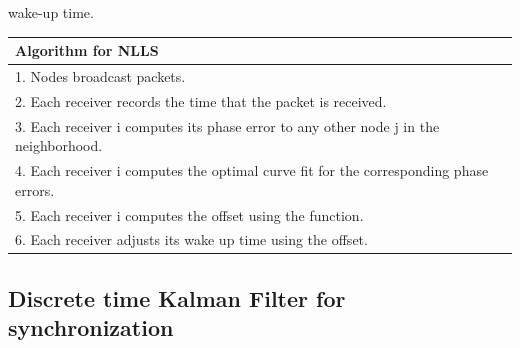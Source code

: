 \documentclass[a4paper,10pt]{report}
\begin{document}
wake-up time. \newline
\newline
\begin{tabular}{  l }Algorithm for NLLS \\\hline
1. Nodes broadcast packets. \\  2. Each receiver records the time that the packet is received. \\
3. Each receiver i computes its phase error to any other node j in the neighborhood. \\
4. Each receiver i computes the optimal curve fit for the corresponding phase errors. \\
5. Each receiver i computes the offset using the function. \\
6. Each receiver adjusts its wake up time using the offset.\\
\hline
\end{tabular}
\subsection{\textbf{Discrete time Kalman Filter for synchronization}}
\end{document}
